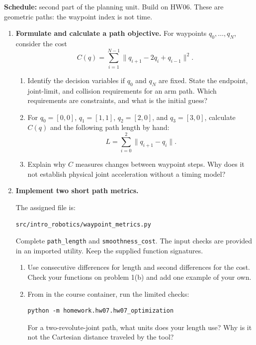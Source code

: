 

\textbf{Schedule:} second part of the planning unit. Build on HW06.
These are geometric paths: the waypoint index is not time.

\begin{enumerate}
\item \textbf{Formulate and calculate a path objective.}
For waypoints $q_0,\ldots,q_N$, consider the cost
\[
C(q)=\sum_{i=1}^{N-1}\|q_{i+1}-2q_i+q_{i-1}\|^2.
\]
\begin{enumerate}
\item Identify the decision variables if $q_0$ and $q_N$ are fixed. State
the endpoint, joint-limit, and collision requirements for an arm path.
Which requirements are constraints, and what is the initial guess?
\item For $q_0=[0,0]$, $q_1=[1,1]$, $q_2=[2,0]$, and $q_3=[3,0]$,
calculate $C(q)$ and the following path length by hand:
\[
L=\sum_{i=0}^{2}\|q_{i+1}-q_i\|.
\]
\item Explain why $C$ measures changes between waypoint steps. Why does it
not establish physical joint acceleration without a timing model?
\end{enumerate}

\item \textbf{Implement two short path metrics.}\par
The assigned file is:
\begin{lstlisting}
src/intro_robotics/waypoint_metrics.py
\end{lstlisting}
Complete \texttt{path\_length} and \texttt{smoothness\_cost}. The input checks are
provided in an imported utility. Keep the supplied function signatures.
\begin{enumerate}
\item Use consecutive differences for length and second differences for the
cost. Check your functions on problem 1(b) and add one example of your own.
\item From  in the course container, run the limited checks:
\begin{lstlisting}
python -m homework.hw07.hw07_optimization
\end{lstlisting}
For a two-revolute-joint path, what units does your length use? Why is it not
the Cartesian distance traveled by the tool?
\end{enumerate}
\end{enumerate}


